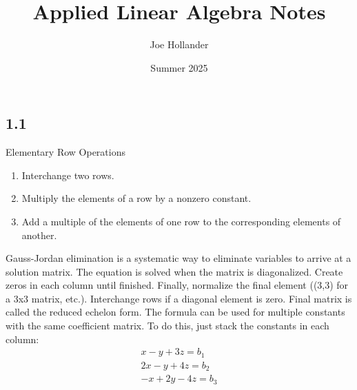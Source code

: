 \documentclass{article}
\title{Applied Linear Algebra Notes}
\author{Joe Hollander}
\date{Summer 2025}
\begin{document}
\maketitle 

\section{}
    \subsection*{1.1}
    Elementary Row Operations
    \begin{enumerate}
        \item Interchange two rows.
        \item Multiply the elements of a row by a nonzero constant.
        \item Add a multiple of the elements of one row to the corresponding elements of another.
    \end{enumerate}
    Gauss-Jordan elimination is a systematic way to eliminate variables to arrive at a solution matrix. 
    The equation is solved when the matrix is diagonalized. Create zeros in each column until finished. 
    Finally, normalize the final element ((3,3) for a 3x3 matrix, etc.). 
    Interchange rows if a diagonal element is zero. Final matrix is called the reduced echelon form.
    The formula can be used for multiple constants with the same coefficient matrix. 
    To do this, just stack the constants in each column: 
    \begin{gather*}
    x - y + 3z = b_1 \\
    2x - y + 4z = b_2 \\
    -x + 2y -4z = b_3
    \end{gather*}
    
\end{document}
